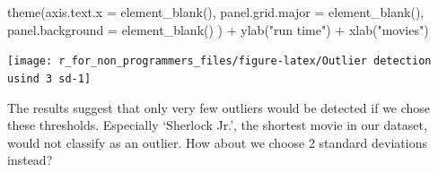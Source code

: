 \documentclass[
]{book}
\newenvironment{Shaded}{\begin{snugshade}}{\end{snugshade}}
\newcommand{\AttributeTok}[1]{\textcolor[rgb]{0.77,0.63,0.00}{#1}}
\newcommand{\FunctionTok}[1]{\textcolor[rgb]{0.00,0.00,0.00}{#1}}
\newcommand{\NormalTok}[1]{#1}
\newcommand{\SpecialCharTok}[1]{\textcolor[rgb]{0.00,0.00,0.00}{#1}}
\newcommand{\StringTok}[1]{\textcolor[rgb]{0.31,0.60,0.02}{#1}}
\begin{document}
\begin{Shaded}
\begin{Highlighting}[]
  \FunctionTok{theme}\NormalTok{(}\AttributeTok{axis.text.x =} \FunctionTok{element\_blank}\NormalTok{(),    }
        \AttributeTok{panel.grid.major =} \FunctionTok{element\_blank}\NormalTok{(),}
        \AttributeTok{panel.background =} \FunctionTok{element\_blank}\NormalTok{()}
\NormalTok{        ) }\SpecialCharTok{+}
  \FunctionTok{ylab}\NormalTok{(}\StringTok{"run time"}\NormalTok{) }\SpecialCharTok{+}
  \FunctionTok{xlab}\NormalTok{(}\StringTok{"movies"}\NormalTok{)}
\end{Highlighting}
\end{Shaded}

\begin{center}\texttt{[image: r\_for\_non\_programmers\_files/figure-latex/Outlier detection usind 3 sd-1]} \end{center}

The results suggest that only very few outliers would be detected if we chose these thresholds. Especially `Sherlock Jr.', the shortest movie in our dataset, would not classify as an outlier. How about we choose 2 standard deviations instead?
\end{document}
